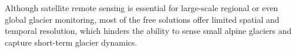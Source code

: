 Although satellite remote sensing is essential for large-scale regional or even global glacier monitoring, most of the free solutions offer limited spatial and temporal resolution, which hinders the ability to sense small alpine glaciers and capture short-term glacier dynamics. 








